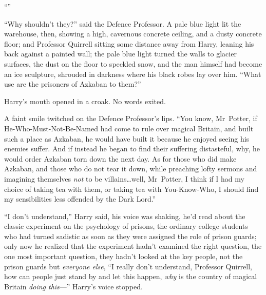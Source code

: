 “”

“Why shouldn’t they?” said the Defence Professor. A pale blue light lit the warehouse, then, showing a high, cavernous concrete ceiling, and a dusty concrete floor; and Professor Quirrell sitting some distance away from Harry, leaning his back against a painted wall; the pale blue light turned the walls to glacier surfaces, the dust on the floor to speckled snow, and the man himself had become an ice sculpture, shrouded in darkness where his black robes lay over him.
“What use are the prisoners of Azkaban to them?”

Harry’s mouth opened in a croak. No words exited.

A faint smile twitched on the Defence Professor’s lips.
“You know, Mr~Potter, if He-Who-Must-Not-Be-Named had come to rule over magical Britain, and built such a place as Azkaban, he would have built it because he enjoyed seeing his enemies suffer. And if instead he began to find their suffering distasteful, why, he would order Azkaban torn down the next day. As for those who did make Azkaban, and those who do not tear it down, while preaching lofty sermons and imagining themselves \emph{not} to be villains…well, Mr~Potter, I think if I had my choice of taking tea with them, or taking tea with You-Know-Who, I should find my sensibilities less offended by the Dark Lord.”

“I don’t understand,” Harry said, his voice was shaking, he’d read about the classic experiment on the psychology of prisons, the ordinary college students who had turned sadistic as soon as they were assigned the role of prison guards; only now he realized that the experiment hadn’t examined the right question, the one most important question, they hadn’t looked at the key people, not the prison guards but \emph{everyone else},
“I really don’t understand, Professor Quirrell, how can people just stand by and let this happen, \emph{why} is the country of magical Britain \emph{doing this}—” Harry’s voice stopped.

